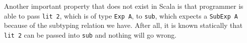 Another important property that does not exist in Scala is that programmer is
able to pass \lstinline{lit 2}, which is of type \lstinline{Exp A}, to
\lstinline{sub}, which expects a \lstinline{SubExp A} because of the subtyping
relation we have. After all, it is known statically that \lstinline{lit 2} can
be passed into \lstinline{sub} and nothing will go
wrong.







